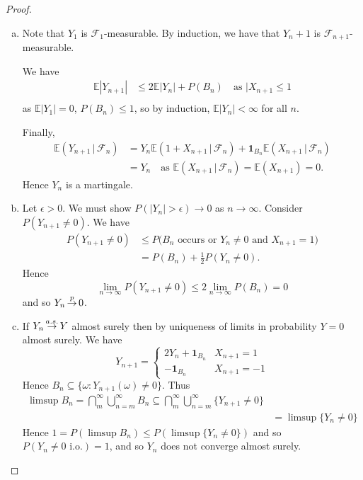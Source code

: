\documentclass[10pt, oneside, reqno]{amsart}
\theoremstyle{plain}%
\theoremstyle{definition}
\theoremstyle{remark}
\newcommand{\given}{ \, | \,}
\newcommand{\sigf}{\mathcal{F}}
\newcommand{\E}{\mathbb{E}}
\def\cip{\,{\buildrel p \over \rightarrow}\,}
\def\cas{\,{\buildrel a.s. \over \rightarrow}\,}
\begin{document}
\begin{proof}{\ }\begin{enumerate}[(a)]
	\item Note that $Y_1$ is $\sigf_1$-measurable.  By induction, we have that $Y_n+1$ is $\sigf_{n+1}$-measurable.  
	
	We have \begin{align*}
		\E|Y_{n+1}| &\leq 2 \E|Y_n | + P(B_n)  \quad \text{as $|X_{n+1} \leq  1$}\\	
	\end{align*}   as $\E|Y_1| = 0$, $P(B_n) \leq 1$, so by induction, $\E|Y_n| <\infty$ for all $n$.  
	
	Finally, \begin{align*}
		\E(Y_{n+1} \given \sigf_n) &= Y_n \E(1 + X_{n+1} \given \sigf_n) + \mathbf{1}_{B_n} \E(X_{n+1} \given \sigf_n) \\
					&= Y_n \quad \text{as $\E(X_{n+1} \given \sigf_n) = \E(X_{n+1}) = 0$.}
	\end{align*}  Hence $Y_n$ is a martingale.
	\item Let $\epsilon > 0$.  We must show $P(|Y_n| > \epsilon) \rightarrow 0$ as $n \rightarrow \infty$.  Consider $P(Y_{n+1} \neq 0)$. We have \begin{align*}
		P(Y_{n+1} \neq 0) &\leq P(\text{$B_n$ occurs or $Y_{n} \neq 0$ and $X_{n+1} = 1$)} \\
						&= P(B_n) + \frac{1}{2} P(Y_n \neq 0).
	\end{align*}  Hence \[
		\lim_{n \rightarrow \infty} P(Y_{n+1} \neq 0) \leq 2 \lim_{n \rightarrow \infty} P(B_n) = 0
	\] and so $Y_n \cip 0$.  
	\item If $Y_n \cas Y$ almost surely then by uniqueness of limits in probability $Y = 0$ almost surely.  We have \[
		Y_{n+1} = \begin{cases}
			2Y_{n} + \mathbf{1}_{B_n} & X_{n+1} = 1 \\
			-\mathbf{1}_{B_n} & X_{n+1} = -1
		\end{cases}
	\]  Hence $B_n \subseteq \{ \omega : Y_{n+1}( \omega) \neq 0 \}$.   Thus \begin{align*}
		\limsup B_n = \bigcap_{m}^\infty \bigcup_{n=m}^\infty B_{n} \subseteq \bigcap_{m}^\infty \bigcup_{n=m}^\infty \{ Y_{n+1} \neq 0 \} \\
		&= \limsup \{Y_n \neq 0 \}
	\end{align*}  Hence $1 = P(\limsup B_n) \leq P(\limsup \{ Y_n \neq 0 \})$ and so $P(Y_n \neq 0 \text{ i.o.}) = 1$, and so $Y_n$ does not converge almost surely.
\end{enumerate}
	
\end{proof}
\end{document}

